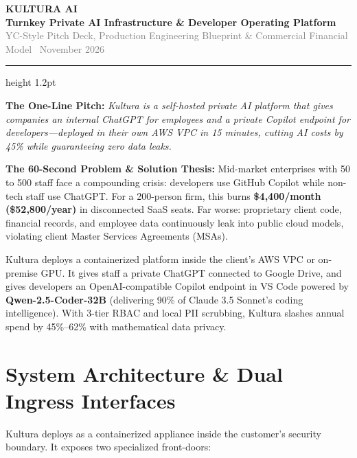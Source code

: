 \documentclass[10pt,a4paper]{article}
\begin{document}
\begin{center}
    {\Huge \textbf{\textcolor{primary}{KULTURA AI}}}\\[4pt]
    {\large \textbf{\textcolor{secondary}{Turnkey Private AI Infrastructure \& Developer Operating Platform}}}\\[3pt]
    {\footnotesize \textcolor{gray}{YC-Style Pitch Deck, Production Engineering Blueprint \& Commercial Financial Model \textbar\ November 2026}}
\end{center}
\vspace{-4pt}
\hrule height 1.2pt
\vspace{8pt}

\begin{pitchbox}
\textbf{The One-Line Pitch:} \textit{Kultura is a self-hosted private AI platform that gives companies an internal ChatGPT for employees and a private Copilot endpoint for developers---deployed in their own AWS VPC in 15 minutes, cutting AI costs by 45\% while guaranteeing zero data leaks.}

\vspace{4pt}
\textbf{The 60-Second Problem \& Solution Thesis:}
Mid-market enterprises with 50 to 500 staff face a compounding crisis: developers use GitHub Copilot while non-tech staff use ChatGPT. For a 200-person firm, this burns \textbf{\$4,400/month (\$52,800/year)} in disconnected SaaS seats. Far worse: proprietary client code, financial records, and employee data continuously leak into public cloud models, violating client Master Services Agreements (MSAs). 

Kultura deploys a containerized platform inside the client's AWS VPC or on-premise GPU. It gives staff a private ChatGPT connected to Google Drive, and gives developers an OpenAI-compatible Copilot endpoint in VS Code powered by \textbf{Qwen-2.5-Coder-32B} (delivering 90\% of Claude 3.5 Sonnet's coding intelligence). With 3-tier RBAC and local PII scrubbing, Kultura slashes annual spend by 45\%--62\% with mathematical data privacy.
\end{pitchbox}

\section{System Architecture \& Dual Ingress Interfaces}

Kultura deploys as a containerized appliance inside the customer's security boundary. It exposes two specialized front-doors:
\end{document}
